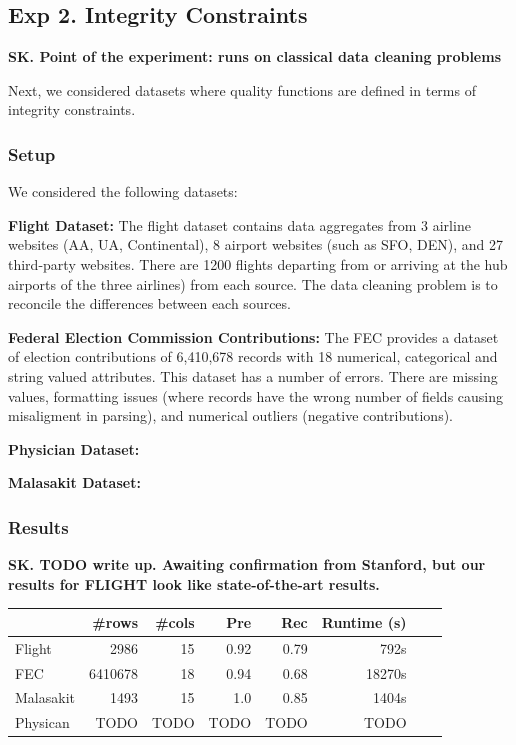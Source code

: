 \subsection*{Exp 2. Integrity Constraints}
\textbf{SK. Point of the experiment: runs on classical data cleaning problems}

Next, we considered datasets where quality functions are defined in terms of integrity constraints.


\subsubsection{Setup}
We considered the following datasets:

\vspace{0.5em}\noindent\textbf{Flight Dataset: } The flight dataset contains data aggregates from 3 airline websites (AA, UA, Continental),
8 airport websites (such as SFO, DEN), and 27 third-party
websites.
There are 1200 flights departing from or arriving at the hub airports of the three airlines) from each source.
The data cleaning problem is to reconcile the differences between each sources.

\vspace{0.5em}\noindent\textbf{Federal Election Commission Contributions: } The FEC provides a dataset of election contributions of 6,410,678 records with 18 numerical, categorical and string valued attributes. This dataset has a number of errors. There are missing values, formatting issues (where records have the wrong number of fields causing misaligment in parsing), and numerical outliers (negative contributions).

\vspace{0.5em}\noindent\textbf{Physician Dataset: }

\vspace{0.5em}\noindent\textbf{Malasakit Dataset: }


 
\subsubsection{Results}

\textbf{SK. TODO write up. Awaiting confirmation from Stanford, but our results for FLIGHT look like state-of-the-art results.}

\begin{table}[ht]
\centering
\begin{tabular}{|l|r|r|r|r|r|r|r|}
\hline
 & \#rows & \#cols & Pre & Rec & Runtime (s) \\
\hline
Flight	&2986&15&0.92&	0.79&	792s\\
\hline
FEC	&6410678&18&0.94&	0.68&	18270s\\
\hline
Malasakit &1493& 15& 1.0 & 0.85& 1404s\\
\hline
Physican	&TODO&TODO&TODO&TODO&TODO\\
\hline
\end{tabular}
\end{table}



